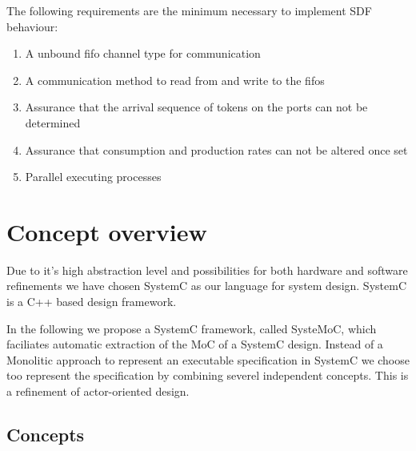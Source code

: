The following requirements are the minimum necessary to
implement SDF behaviour:

\begin{enumerate}
\item A unbound fifo channel type for communication
\item A communication method to read from and write to the fifos
\item Assurance that the arrival sequence of tokens on
      the ports can not be determined
\item Assurance that consumption and production rates can not
      be altered once set
\item Parallel executing processes
\end{enumerate}


\section{Concept overview}

Due to it's high abstraction level and possibilities for both
hardware and software refinements we have chosen SystemC
\cite{systemc-lrm:2003} \cite{glms:2002} as our language for system design.
SystemC is a C++ based design framework.

In the following we propose a SystemC framework, called SysteMoC, which
faciliates automatic extraction of the MoC of a SystemC design.
Instead of a Monolitic approach to represent an executable specification
in SystemC we choose too represent the specification
by combining severel independent concepts. This is a refinement of
actor-oriented design.

\subsection{Concepts}

